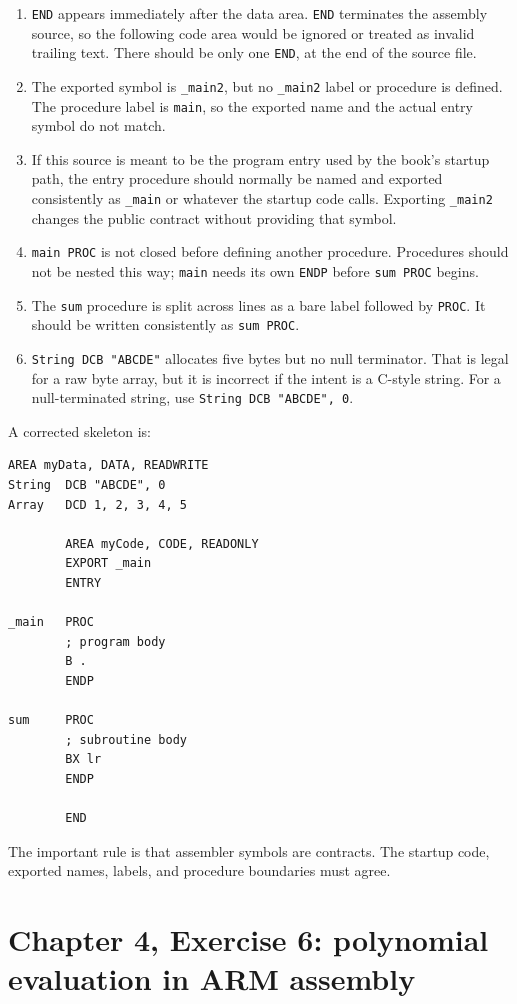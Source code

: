 \documentclass[11pt]{article}
\newcommand{\code}[1]{\texttt{#1}}
\begin{document}
\begin{enumerate}
\item \code{END} appears immediately after the data area. \code{END} terminates the assembly source, so the following code area would be ignored or treated as invalid trailing text. There should be only one \code{END}, at the end of the source file.
\item The exported symbol is \code{\_main2}, but no \code{\_main2} label or procedure is defined. The procedure label is \code{main}, so the exported name and the actual entry symbol do not match.
\item If this source is meant to be the program entry used by the book's startup path, the entry procedure should normally be named and exported consistently as \code{\_main} or whatever the startup code calls. Exporting \code{\_main2} changes the public contract without providing that symbol.
\item \code{main PROC} is not closed before defining another procedure. Procedures should not be nested this way; \code{main} needs its own \code{ENDP} before \code{sum PROC} begins.
\item The \code{sum} procedure is split across lines as a bare label followed by \code{PROC}. It should be written consistently as \code{sum PROC}.
\item \code{String DCB "ABCDE"} allocates five bytes but no null terminator. That is legal for a raw byte array, but it is incorrect if the intent is a C-style string. For a null-terminated string, use \code{String DCB "ABCDE", 0}.
\end{enumerate}

A corrected skeleton is:

\begin{Verbatim}[fontsize=\small]
        AREA myData, DATA, READWRITE
String  DCB "ABCDE", 0
Array   DCD 1, 2, 3, 4, 5

        AREA myCode, CODE, READONLY
        EXPORT _main
        ENTRY

_main   PROC
        ; program body
        B .
        ENDP

sum     PROC
        ; subroutine body
        BX lr
        ENDP

        END
\end{Verbatim}

The important rule is that assembler symbols are contracts. The startup code, exported names, labels, and procedure boundaries must agree.

\section*{Chapter 4, Exercise 6: polynomial evaluation in ARM assembly}
\end{document}
